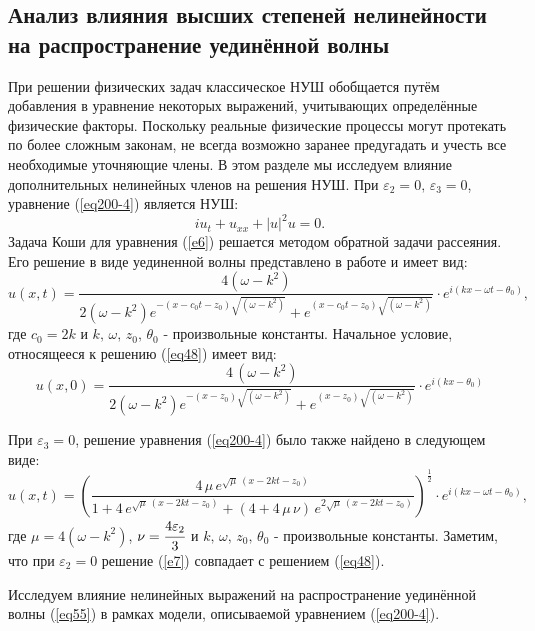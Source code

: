 \documentclass[12pt,a4paper]{article}
\begin{document}
\subsection{Анализ влияния высших степеней нелинейности на распространение уединённой волны}\label{ch330}
	При решении физических задач классическое НУШ обобщается путём добавления в уравнение некоторых выражений, учитывающих определённые физические факторы. Поскольку реальные физические процессы могут протекать по более сложным законам, не всегда возможно заранее предугадать и учесть все необходимые уточняющие члены. В этом разделе мы исследуем влияние дополнительных нелинейных членов на решения НУШ.
	При \(\varepsilon_{2}=0,\,\varepsilon_{3}=0\), уравнение (\ref{eq200-4}) является НУШ:
	\begin{equation}\label{e6}
		iu_{t}+u_{xx}+|u|^2 u=0.
	\end{equation}
	Задача Коши для уравнения (\ref{e6}) решается методом обратной задачи рассеяния. Его решение в виде уединенной волны представлено в работе \cite{Rad3} и имеет вид:
	\begin{equation} \label{eq48}
		u(x,t)=\frac{4(\omega-k^{2})}{2 (\omega-k^{2}) e^{-\left(x-c_{0}t-z_{0}\right)\sqrt{(\omega-k^{2})}}+e^{\left(x-c_{0}t-z_{0}\right)\sqrt{(\omega-k^{2})}}}\cdot e^{i(kx-\omega t-\theta_{0})},
	\end{equation}
	где \(c_{0}=2k\) и \( k,\, \omega,\, z_{0},\, \theta_{0}\) - произвольные константы.
	Начальное условие, относящееся к решению (\ref{eq48}) имеет вид:
	\begin{equation}\label{eq55}
		u(x,0)=\frac{4\,(\omega-k^{2})}{2 (\omega-k^{2}) e^{-(x-z_{0})\sqrt{(\omega-k^{2})}}+e^{(x-z_{0})\sqrt{(\omega-k^{2})}}}\cdot e^{i(kx-\theta_{0})}
	\end{equation}

	При \(\varepsilon_{3}=0\), решение уравнения (\ref{eq200-4}) было также найдено в следующем виде:
	\begin{equation}\label{e7}
		u(x,t)=\left(\frac{4\,\mu\, e^{\sqrt{\mu}\,(x-2kt-z_{0})}}{1+4\, e^{\sqrt{\mu}\,(x-2kt-z_{0})}+(4+4\, \mu\, \nu) \,e^{2\sqrt{\mu}\,(x-2kt-z_{0})}}\right)^{\frac{1}{2}}\cdot e^{i(kx-\omega t-\theta_{0})},
	\end{equation}
	где \(\mu=4(\omega-k^{2})\), \(\nu=\cfrac{4 \varepsilon_{2}}{3}\) и \( k,\, \omega,\, z_{0},\, \theta_{0}\) - произвольные константы. Заметим, что при \(\varepsilon_{2}=0\) решение (\ref{e7}) совпадает с решением (\ref{eq48}).

	Исследуем влияние нелинейных выражений на распространение уединённой волны (\ref{eq55}) в рамках модели, описываемой уравнением (\ref{eq200-4}).
\end{document}
